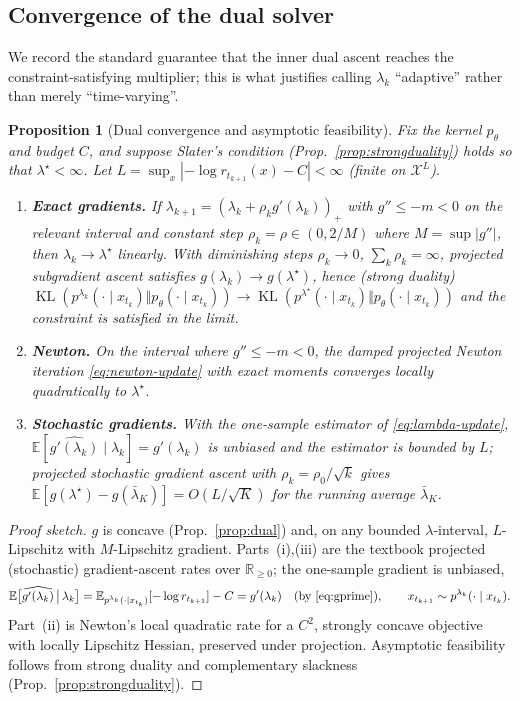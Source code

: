 \documentclass{article}
\newtheorem{proposition}{Proposition}
\DeclareMathOperator{\KL}{KL}
\newcommand{\E}{\mathbb{E}}
\newcommand{\R}{\mathbb{R}}
\newcommand{\X}{\mathcal{X}}
\newcommand{\lstar}{\lambda^{\star}}
\begin{document}
\subsection{Convergence of the dual solver}
We record the standard guarantee that the inner dual ascent reaches the constraint-satisfying multiplier; this is what justifies calling $\lambda_k$ ``adaptive'' rather than merely ``time-varying''.

\begin{proposition}[Dual convergence and asymptotic feasibility]
\label{prop:converge}
Fix the kernel $p_\theta$ and budget $C$, and suppose Slater's condition (Prop.~\ref{prop:strongduality}) holds so that $\lstar<\infty$. Let $L=\sup_x|{-}\log r_{t_{k+1}}(x)-C|<\infty$ (finite on $\X^L$).
\begin{enumerate}
\item[(i)] \textbf{Exact gradients.} If $\lambda_{k+1}=(\lambda_k+\rho_k g'(\lambda_k))_+$ with $g''\le-m<0$ on the relevant interval and constant step $\rho_k=\rho\in(0,2/M)$ where $M=\sup|g''|$, then $\lambda_k\to\lstar$ linearly. With diminishing steps $\rho_k\to0$, $\sum_k\rho_k=\infty$, projected subgradient ascent satisfies $g(\lambda_k)\to g(\lstar)$, hence (strong duality) $\KL(p^{\lambda_k}(\cdot\mid x_{t_k})\Vert p_\theta(\cdot\mid x_{t_k}))\to\KL(p^{\lstar}(\cdot\mid x_{t_k})\Vert p_\theta(\cdot\mid x_{t_k}))$ and the constraint is satisfied in the limit.
\item[(ii)] \textbf{Newton.} On the interval where $g''\le -m<0$, the damped projected Newton iteration \eqref{eq:newton-update} with exact moments converges locally quadratically to $\lstar$.
\item[(iii)] \textbf{Stochastic gradients.} With the one-sample estimator of \eqref{eq:lambda-update}, $\E[\widehat{g'(\lambda_k)}\mid\lambda_k]=g'(\lambda_k)$ is unbiased and the estimator is bounded by $L$; projected stochastic gradient ascent with $\rho_k=\rho_0/\sqrt{k}$ gives $\E[g(\lstar)-g(\bar\lambda_K)]=O(L/\sqrt{K})$ for the running average $\bar\lambda_K$.
\end{enumerate}
\end{proposition}
\begin{proof}[Proof sketch]
$g$ is concave (Prop.~\ref{prop:dual}) and, on any bounded $\lambda$-interval, $L$-Lipschitz with $M$-Lipschitz gradient. Parts~(i),(iii) are the textbook projected (stochastic) gradient-ascent rates over $\R_{\ge0}$; the one-sample gradient is unbiased,
\begin{equation*}
\E\big[\widehat{g'(\lambda_k)}\,\big|\,\lambda_k\big]
=\E_{p^{\lambda_k}(\cdot\mid x_{t_k})}[-\log r_{t_{k+1}}]-C
=g'(\lambda_k)\quad(\text{by }\eqref{eq:gprime}),\qquad x_{t_{k+1}}\sim p^{\lambda_k}(\cdot\mid x_{t_k}).
\end{equation*}
Part~(ii) is Newton's local quadratic rate for a $C^2$, strongly concave objective with locally Lipschitz Hessian, preserved under projection. Asymptotic feasibility follows from strong duality and complementary slackness (Prop.~\ref{prop:strongduality}).
\end{proof}
\end{document}
